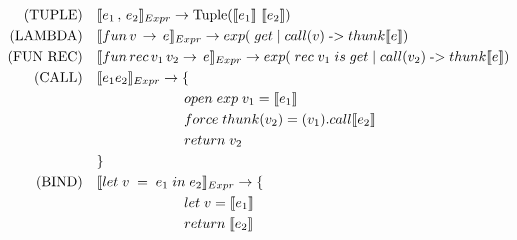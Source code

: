 \documentclass[
  12pt,
]{article}
\begin{document}
\begin{align*}
  \text{(TUPLE)} \quad     & \translateNode{e_1 \, , \, e_2}{Expr} \rightarrow \text{Tuple}(\translateResult{e_1} \, \, \translateResult{e_2})                                                            \\
  \text{(LAMBDA)} \quad    & \translateNode{fun \, v \, \rightarrow \, e}{Expr}    \rightarrow  exp(  \; get \; | \; call(v) \; \text{->}  \; thunk\translateResult{e}  )                                   \\
  \text{(FUN REC)} \quad   & \translateNode{fun \, rec \, v_1 \, v_2 \rightarrow \, e}{Expr}      \rightarrow exp( \; rec \; v_1 \; is \; get \; | \; call(v_2) \; \text{->}  \; thunk\translateResult{e} ) \\
  \text{(CALL)} \quad      & \translateNode{e_1 e_2}{Expr}     \rightarrow  \{                                                                                                                              \\
                           & \Tab open \; exp \; v_1  = \translateResult{e_1}                                                                                                                               \\
                           & \Tab force \; thunk(v_2) = (v_1).call\translateResult{e_2}                                                                                                                     \\
                           & \Tab return \; v_2                                                                                                                                                             \\
                           & \}                                                                                                                                                                             \\
  \text{(BIND)} \quad      & \translateNode{let \; v \; = \; e_1 \; in \; e_2}{Expr}  \rightarrow  \{                                                                                                       \\
                           & \Tab let \; v = \translateResult{e_1}                                                                                                                                          \\
                           & \Tab return \;\translateResult{e_2}                                                                                                                                            \\

\end{align*}
\end{document}
